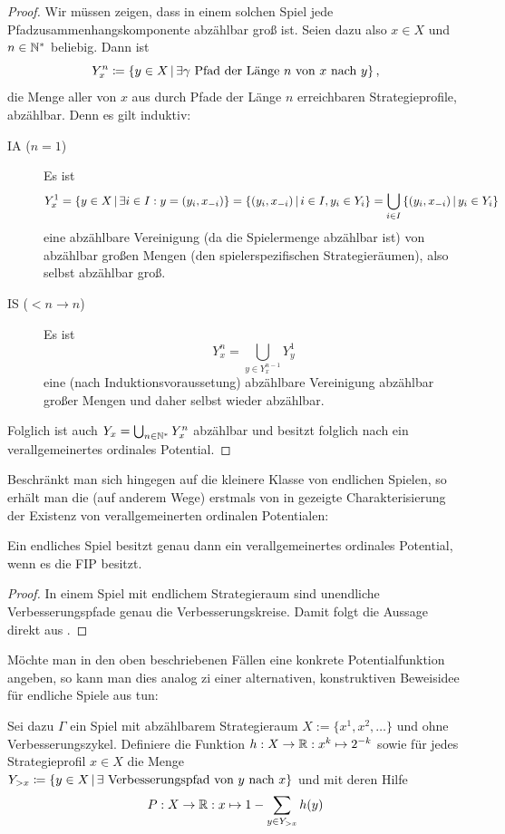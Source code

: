 \begin{proof}
	Wir müssen zeigen, dass in einem solchen Spiel jede Pfadzusammenhangskomponente abzählbar groß ist. Seien dazu also $x \in X$ und $n \in \mathbb{N}^\ast$ beliebig. Dann ist
		\[Y_x^n \coloneqq \left\{y \in X \,\middle|\, \exists \gamma \text{ Pfad der Länge $n$ von $x$ nach $y$}\right\}, \]
	die Menge aller von $x$ aus durch Pfade der Länge $n$ erreichbaren Strategieprofile, abzählbar. Denn es gilt induktiv:
	\begin{description}
		\item[IA ($n=1$)] Es ist
			\[Y_x^1 = \left\{y \in X \,\middle|\, \exists i \in I: y = (y_i, x_{-i})\right\} = \left\{(y_i, x_{-i}) \,\middle|\, i \in I, y_i \in Y_i \right\} = \bigcup_{i \in I} \left\{(y_i, x_{-i}) \,\middle|\, y_i \in Y_i \right\}\]
			eine abzählbare Vereinigung (da die Spielermenge abzählbar ist) von abzählbar großen Mengen (den spielerspezifischen Strategieräumen), also selbst abzählbar groß.
		\item[IS ($<n \to n$)] Es ist
			\[Y_x^n = \bigcup_{y \in Y_x^{n-1}} Y_y^1\]
			eine (nach Induktionsvoraussetung) abzählbare Vereinigung abzählbar großer Mengen und daher selbst wieder abzählbar.
	\end{description}
	Folglich ist auch $Y_x = \bigcup_{n\in\mathbb{N}^\ast} Y_x^n$ abzählbar und besitzt folglich nach  ein verallgemeinertes ordinales Potential.
\end{proof}

Beschränkt man sich hingegen auf die kleinere Klasse von endlichen Spielen, so erhält man die (auf anderem Wege) erstmals von \citeauthor{MonShap} in \cite[Lemma 2.5]{MonShap} gezeigte Charakterisierung der Existenz von verallgemeinerten ordinalen Potentialen:

\begin{kor}
	Ein endliches Spiel besitzt genau dann ein verallgemeinertes ordinales Potential, wenn es die FIP besitzt.
\end{kor}

\begin{proof}
	In einem Spiel mit endlichem Strategieraum sind unendliche Verbesserungspfade genau die Verbesserungskreise. Damit folgt die Aussage direkt aus .
\end{proof}

\begin{bem}
	Möchte man in den oben beschriebenen Fällen eine konkrete Potentialfunktion angeben, so kann man dies analog zi einer alternativen, konstruktiven Beweisidee für endliche Spiele aus \cite[Abschnitt 5]{CongGamesPlayerSpecPayoff} tun:

Sei dazu $\Gamma$ ein Spiel mit abzählbarem Strategieraum $X := \{x^1, x^2, \dots \}$ und ohne Verbesserungszykel. Definiere die Funktion $h: X \to \mathbb{R}: x^k \mapsto 2^{-k}$ sowie für jedes Strategieprofil $x \in X$ die Menge $Y_{>x} \coloneqq \left\{y \in X \,\middle|\, \exists \text{ Verbesserungspfad von } y \text{ nach } x\right\}$ und mit deren Hilfe
	\[P: X \to \mathbb{R}: x \mapsto 1 - \sum_{y \in Y_{>x}} h(y)\]
\end{bem}


